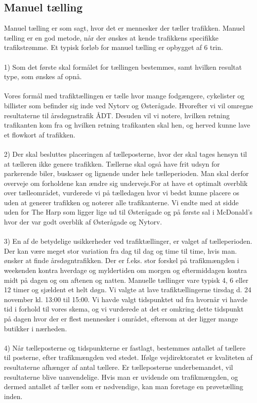 \subsection{Manuel tælling}
\label{sub:manuel_taelling}
Manuel tælling er som sagt, hvor det er mennesker der tæller trafikken. Manuel tælling er en god metode, når der ønskes at kende trafikkens specifikke trafikstrømme. Et typisk forløb for manuel tælling er opbygget af 6 trin.
\\\\
1) Som det første skal formålet for tællingen bestemmes, samt hvilken resultat type, som ønskes af opnå.
\\\\
Vores formål med trafiktællingen er tælle hvor mange fodgængere, cykelister og billister som befinder sig inde ved Nytorv og Østerågade. Hvorefter vi vil omregne resultaterne til årsdøgnstrafik ÅDT. Desuden vil vi notere, hvilken retning trafikanten kom fra og hvilken retning trafikanten skal hen, og herved kunne lave et flowkort af trafikken.
\\\\
2) Der skal besluttes placeringen af tælleposterne, hvor der skal tages hensyn til at tælleren ikke genere trafikken. Tællerne skal også have frit udsyn for parkerende biler, buskaser og lignende under hele tælleperioden. Man skal derfor overveje om forholdene kan ændre sig undervejs.For at have et optimalt overblik over tælleområdet, vurderede vi på tælledagen hvor vi bedst kunne placere os uden at generer trafikken og noterer alle trafikanterne. Vi endte med at sidde uden for The Harp som ligger lige ud til Østerågade og på første sal i McDonald’s hvor der var godt overblik af Østerågade og Nytorv.
\\\\
3) En af de betydelige usikkerheder ved trafiktællinger, er valget af tælleperioden. Der kan være meget stor variation fra dag til dag og time til time, hvis man. ønsker at finde årsdøgntrafikken. Der er f.eks. stor forskel på trafikmængden i weekenden kontra hverdage og myldertiden om morgen og eftermiddagen kontra midt på dagen og om aftenen og natten. Manuelle tællinger vare typisk 4, 6 eller 12 timer og sjældent et helt døgn. Vi valgte at lave trafiktællingerne tirsdag d. 24 november kl. 13:00 til 15:00. Vi havde valgt tidspunktet ud fra hvornår vi havde tid i forhold til vores skema, og vi vurderede at det er omkring dette tidspunkt på dagen hvor der er flest mennesker i området, eftersom at der ligger mange butikker i nærheden.
\\\\
4) Når tælleposterne og tidspunkterne er fastlagt, bestemmes antallet af tællere til posterne, efter trafikmængden ved stedet. Ifølge vejdirektoratet er kvaliteten af resultaterne afhænger af antal tællere. Er tælleposterne underbemandet, vil resultaterne blive uanvendelige. Hvis man er uvidende om trafikmængden, og dermed antallet af tæller som er nødvendige, kan man foretage en prøvetælling inden.

